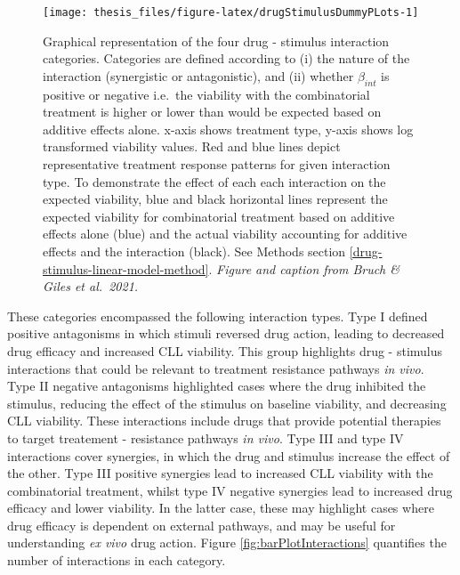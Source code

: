 \documentclass[11pt, a4paper, twosided]{book}
\begin{document}
\begin{figure}

{\centering \texttt{[image: thesis\_files/figure-latex/drugStimulusDummyPLots-1]} 

}

\caption{Graphical representation of the four drug - stimulus interaction categories. Categories are defined according to (i) the nature of the interaction (synergistic or antagonistic), and (ii) whether \(\beta_{int}\) is positive or negative i.e.~the viability with the combinatorial treatment is higher or lower than would be expected based on additive effects alone. x-axis shows treatment type, y-axis shows log transformed viability values. Red and blue lines depict representative treatment response patterns for given interaction type. To demonstrate the effect of each each interaction on the expected viability, blue and black horizontal lines represent the expected viability for combinatorial treatment based on additive effects alone (blue) and the actual viability accounting for additive effects and the interaction (black). See Methods section \ref{drug-stimulus-linear-model-method}. \emph{Figure and caption from Bruch \& Giles et al.~2021.}}\label{fig:drugStimulusDummyPLots}
\end{figure}
These categories encompassed the following interaction types. Type I defined positive antagonisms in which stimuli reversed drug action, leading to decreased drug efficacy and increased CLL viability. This group highlights drug - stimulus interactions that could be relevant to treatment resistance pathways \emph{in vivo}. Type II negative antagonisms highlighted cases where the drug inhibited the stimulus, reducing the effect of the stimulus on baseline viability, and decreasing CLL viability. These interactions include drugs that provide potential therapies to target treatement - resistance pathways \emph{in vivo}. Type III and type IV interactions cover synergies, in which the drug and stimulus increase the effect of the other. Type III positive synergies lead to increased CLL viability with the combinatorial treatment, whilst type IV negative synergies lead to increased drug efficacy and lower viability. In the latter case, these may highlight cases where drug efficacy is dependent on external pathways, and may be useful for understanding \emph{ex vivo} drug action. Figure \ref{fig:barPlotInteractions} quantifies the number of interactions in each category.
\end{document}
